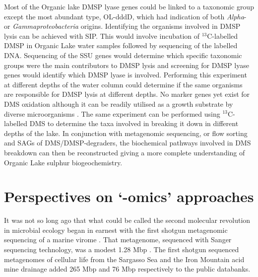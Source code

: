 Most of the Organic lake \ac{DMSP} lyase genes could be linked to a taxonomic group except the most abundant type, OL-dddD, which had indication of both \emph{Alpha}- or \emph{Gammaproteobacteria} origins.
Identifying the organisms involved in \ac{DMSP} lysis can be achieved with \ac{SIP}.
This would involve incubation of $^{13}$C-labelled \ac{DMSP} in Organic Lake water samples followed by sequencing of the labelled DNA.
Sequencing of the \ac{SSU} genes would determine which specific taxonomic groups were the main contributors to \ac{DMSP} lysis and screening for \ac{DMSP} lyase genes would identify which \ac{DMSP} lyase is involved.
Performing this experiment at different depths of the water column could determine if the same organisms are responsible for \ac{DMSP} lysis at different depths.
No marker genes yet exist for \ac{DMS} oxidation although it can be readily utilised as a growth substrate by diverse microorganisms \cite{Johnston2008}.
The same experiment can be performed using $^{13}$C-labelled \ac{DMS} to determine the taxa involved in breaking it down in different depths of the lake.
In conjunction with metagenomic sequencing, or flow sorting and \acp{SAG} of \ac{DMS}/\ac{DMSP}-degraders, the biochemical pathways involved in \ac{DMS} breakdown can then be reconstructed giving a more complete understanding of Organic Lake sulphur biogeochemistry.

\section{Perspectives on `-omics' approaches }
It was not so long ago that what could be called the second molecular revolution in microbial ecology began in earnest with the first shotgun metagenomic sequencing of a marine virome \cite{Breitbart2002}.
That metagenome, sequenced with Sanger sequencing technology, was a modest 1.28 Mbp \cite{Breitbart2002}.
The first shotgun sequenced metagenomes of cellular life from the Sargasso Sea \cite{Venter2004} and the Iron Mountain acid mine drainage \cite{Tyson2004} added 265 Mbp and 76 Mbp respectively to the public databanks.

